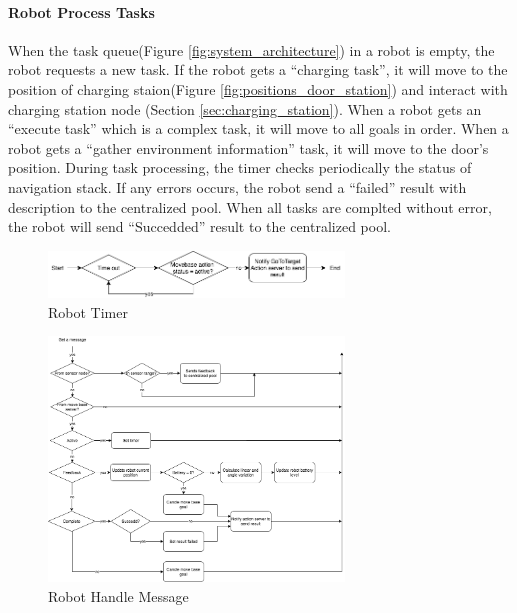 \paragraph{Robot Process Tasks}
When the task queue(Figure \ref{fig:system_architecture}) in a robot is empty, the robot requests a new task. If the robot gets a ``charging task'', it will move to the position of charging staion(Figure \ref{fig:positions_door_station}) and interact with charging station node (Section \ref{sec:charging_station}).
When a robot gets an ``execute task'' which is a complex task, it will move to all goals in order.
When a robot gets a ``gather environment information'' task, it will move to the door's position.
During task processing, the timer checks periodically the status of navigation stack. If any errors occurs, the robot send a ``failed'' result with description to the centralized pool.  
When all tasks are complted without error, the robot will send ``Succedded'' result to the centralized pool.


\begin{figure}[htbp]
    \centering
    \includegraphics[width = 0.7\textwidth]{content/images/ch4/robot_timer.drawio.png}
    \caption{Robot Timer}
    \label{fig:robot_timer}
\end{figure}

\begin{figure}[htbp]
    \centering
    \includegraphics[width = 0.7\textwidth]{content/images/ch4/robot_message.drawio.png}
    \caption{Robot Handle Message}
    \label{fig:robot_handle_message}
\end{figure}

